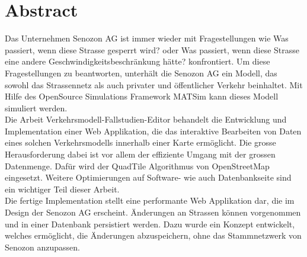 \chapter{Abstract}
Das Unternehmen Senozon AG ist immer wieder mit Fragestellungen wie \glqq{}Was passiert, wenn diese Strasse gesperrt wird?\grqq{} oder \glqq{}Was passiert, wenn diese Strasse eine andere Geschwindigkeitsbeschränkung hätte?\grqq{} konfrontiert. Um diese Fragestellungen zu beantworten, unterhält die Senozon AG ein Modell, das sowohl das Strassennetz als auch privater und öffentlicher Verkehr beinhaltet. Mit Hilfe des OpenSource Simulations Framework MATSim kann dieses Modell simuliert werden.\\
Die Arbeit \glqq{}Verkehrsmodell-Fallstudien-Editor\grqq{} behandelt die Entwicklung und Implementation einer Web Applikation, die das interaktive Bearbeiten von Daten eines solchen Verkehrsmodells innerhalb einer Karte ermöglicht. Die grosse Herausforderung dabei ist vor allem der effiziente Umgang mit der grossen Datenmenge. Dafür wird der QuadTile Algorithmus von OpenStreetMap \cite{OSMQuadTiles} eingesetzt. Weitere Optimierungen auf Software- wie auch Datenbankseite sind ein wichtiger Teil dieser Arbeit.\\
Die fertige Implementation stellt eine performante Web Applikation dar, die im Design der Senozon AG erscheint. Änderungen an Strassen können vorgenommen und in einer Datenbank persistiert werden. Dazu wurde ein Konzept entwickelt, welches ermöglicht, die Änderungen abzuspeichern, ohne das Stammnetzwerk von Senozon anzupassen.\\